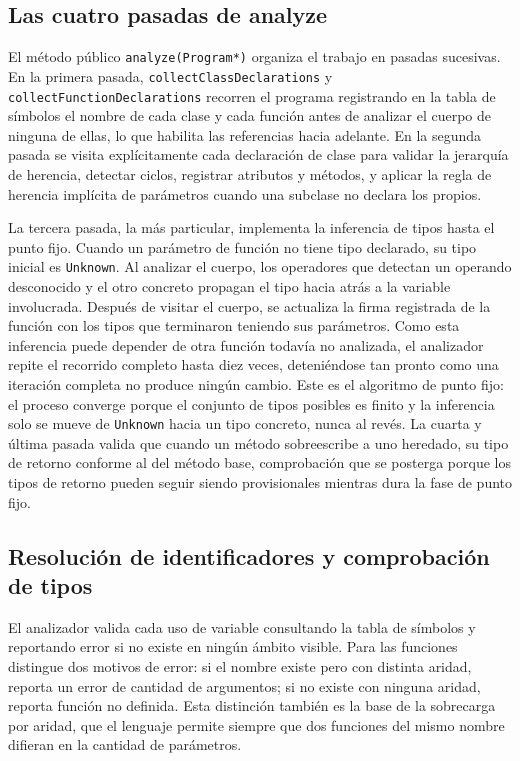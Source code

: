 \documentclass[11pt,a4paper]{article}
\begin{document}
\subsection{Las cuatro pasadas de analyze}

El método público \texttt{analyze(Program*)} organiza el trabajo en pasadas sucesivas. En la primera pasada, \texttt{collectClassDeclarations} y \texttt{collectFunctionDeclarations} recorren el programa registrando en la tabla de símbolos el nombre de cada clase y cada función antes de analizar el cuerpo de ninguna de ellas, lo que habilita las referencias hacia adelante. En la segunda pasada se visita explícitamente cada declaración de clase para validar la jerarquía de herencia, detectar ciclos, registrar atributos y métodos, y aplicar la regla de herencia implícita de parámetros cuando una subclase no declara los propios.

La tercera pasada, la más particular, implementa la inferencia de tipos hasta el punto fijo. Cuando un parámetro de función no tiene tipo declarado, su tipo inicial es \texttt{Unknown}. Al analizar el cuerpo, los operadores que detectan un operando desconocido y el otro concreto propagan el tipo hacia atrás a la variable involucrada. Después de visitar el cuerpo, se actualiza la firma registrada de la función con los tipos que terminaron teniendo sus parámetros. Como esta inferencia puede depender de otra función todavía no analizada, el analizador repite el recorrido completo hasta diez veces, deteniéndose tan pronto como una iteración completa no produce ningún cambio. Este es el algoritmo de punto fijo: el proceso converge porque el conjunto de tipos posibles es finito y la inferencia solo se mueve de \texttt{Unknown} hacia un tipo concreto, nunca al revés. La cuarta y última pasada valida que cuando un método sobreescribe a uno heredado, su tipo de retorno conforme al del método base, comprobación que se posterga porque los tipos de retorno pueden seguir siendo provisionales mientras dura la fase de punto fijo.

\subsection{Resolución de identificadores y comprobación de tipos}

El analizador valida cada uso de variable consultando la tabla de símbolos y reportando error si no existe en ningún ámbito visible. Para las funciones distingue dos motivos de error: si el nombre existe pero con distinta aridad, reporta un error de cantidad de argumentos; si no existe con ninguna aridad, reporta función no definida. Esta distinción también es la base de la sobrecarga por aridad, que el lenguaje permite siempre que dos funciones del mismo nombre difieran en la cantidad de parámetros.
\end{document}

